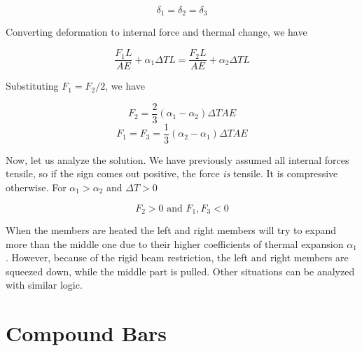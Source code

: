\documentclass[
fontsize=10pt,
a4paper,
twosides=false,
open=any,
svgnames,
]{kaobook} %
\begin{document}
\begin{example}
  $$ \delta_1 = \delta_2 = \delta_3 $$

  Converting deformation to internal force and thermal change, we have

  $$ \frac{F_1 L}{AE} + \alpha_1 \Delta TL = \frac{F_2 L}{AE} + \alpha_2 \Delta TL $$ 

  Substituting $F_1 = F_2 / 2$, we have

  $$ F_2 = \frac{2}{3} \left( \alpha_1 - \alpha_2 \right) \Delta T A E $$
  $$ F_1 = F_3 = \frac{1}{3} \left( \alpha_2 - \alpha_1 \right) \Delta T A E $$

  Now, let us analyze the solution. We have previously assumed all internal forces tensile, so if the sign comes out positive, the force \emph{is} tensile. It is compressive otherwise. For $\alpha_1 > \alpha_2$ and $\Delta T > 0$

  $$ F_2 > 0 \text{ and } F_1, F_3 < 0 $$

  When the members are heated the left and right members will try to expand more than the middle one due to their higher coefficients of thermal expansion $\alpha_1$. However, because of the rigid beam restriction, the left and right members are squeezed down, while the middle part is pulled. Other situations can be analyzed with similar logic.
\end{example}

\section{Compound Bars}
\end{document}
